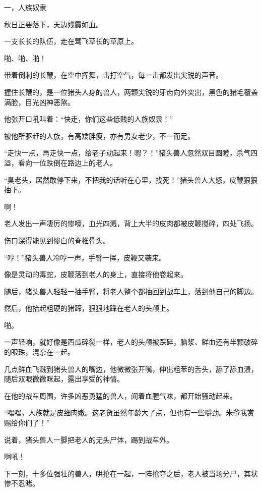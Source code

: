 
\begin{this_body}

一，人族奴隶

秋日正要落下，天边残霞如血。

一支长长的队伍，走在莺飞草长的草原上。

啪、啪、啪！

带着倒刺的长鞭，在空中挥舞，击打空气，每一击都发出尖锐的声音。

握住长鞭的，是一位猪头人身的兽人，两颗尖锐的牙齿向外突出，黑色的猪毛覆盖满脸，目光凶神恶煞。

他张开口吼叫着：“快走，你们这些低贱的人族奴隶！”

被他所驱赶的人族，有高矮胖瘦，亦有男女老少，不一而足。

“走快一点，再走快一点，给老子动起来！嗯？！”猪头兽人忽然双目圆瞪，杀气四溢，看向一位跌倒在路边上的老人。

“臭老头，居然敢停下来，不把我的话听在心里，找死！”猪头兽人大怒，皮鞭狠狠抽下。

啊！

老人发出一声凄厉的惨嚎，血光四溅，背上大半的皮肉都被皮鞭搅碎，四处飞扬。

伤口深得能见到惨白的脊椎骨头。

“哼！”猪头兽人冷哼一声，手臂一挥，皮鞭又袭来。

像是灵动的毒蛇，皮鞭落到老人的身上，直接将他卷起来。

随后，猪头兽人轻轻一抽手臂，将老人整个都抽回到战车上，落到他自己的脚边。

然后，他抬起粗硬的猪蹄，狠狠地踩在老人的头颅上。

啪。

一声轻响，就好像是西瓜碎裂一样，老人的头颅被踩碎，脑浆、鲜血还有半颗破碎的眼珠，混杂在一起。

几点鲜血飞溅到猪头兽人的嘴边，他微微张开嘴，伸出粗苯的舌头，舔了舔血渍，随后双眼微微眯起，露出享受的神情。

在他的战车周围，许多凶恶勇猛的兽人，闻着血腥气味，都开始骚动起来。

“嘿嘿，人族就是皮细肉嫩。这老货虽然年龄大了点，但也有一些嚼劲。朱爷我赏赐给你们了！”

说着，猪头兽人一脚把老人的无头尸体，踢到战车外。

啊吼！

下一刻，十多位强壮的兽人，哄抢在一起，一阵抢夺之后，老人被当场分尸，其状惨不忍睹。


\end{this_body}
